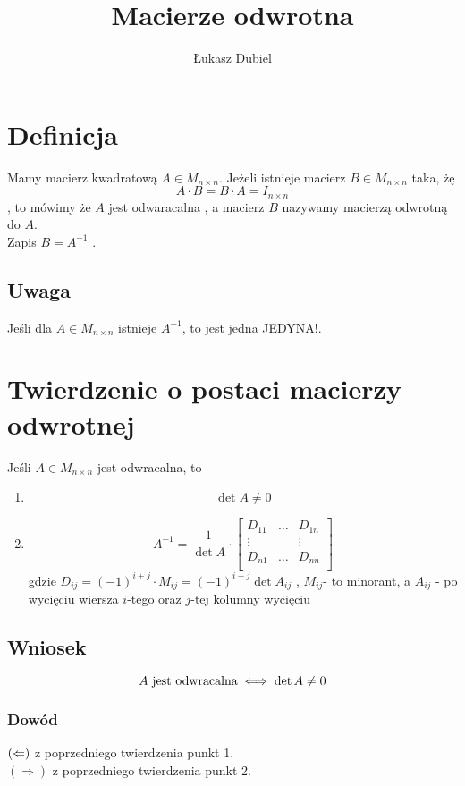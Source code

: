 \documentclass[11pt]{article}
\author{Łukasz Dubiel}
\title{Macierze odwrotna}
\begin{document}
\maketitle

\section{Definicja}
Mamy macierz kwadratową $A \in M_{n \times n}$. Jeżeli istnieje macierz $ B \in M_{ n \times n}$ taka, żę
$$ A \cdot B = B \cdot A = I_{n \times n} $$, to mówimy że  $A$ jest odwaracalna , a macierz $B$ nazywamy macierzą odwrotną do $A$. \\ Zapis $B = A^{-1}$ .

\subsection{Uwaga}
Jeśli dla $A \in M_{n \times n}$ istnieje $ A^{-1}$, to jest jedna JEDYNA!.

\section{Twierdzenie o postaci macierzy odwrotnej}
Jeśli $A \in M_{n \times n}$ jest odwracalna, to \\ \begin{enumerate}
\item{ $$\det{A}\not = 0$$}
\item{ $$A^{-1} = \frac{1}{\det{A}} \cdot \begin{bmatrix}
	D_{11} & \ldots & D_{1n}\\
	\vdots &  & \vdots\\
	D_{n1} & \ldots & D_{nn}\\
\end{bmatrix}$$ gdzie $D_{ij} = (-1)^{i+j} \cdot M_{ij} = (-1)^{i+j} \det{A_{ij}}$ , $M_{ij}$- to minorant, a $A_{ij}$ - po wycięciu wiersza $i$-tego oraz $j$-tej kolumny wycięciu}
\end{enumerate}
\subsection{Wniosek}
$$ A \hbox{ jest odwracalna} \iff \det{A} \not = 0 $$
\subsubsection{Dowód}
$\\(\Leftarrow)$ z poprzedniego twierdzenia punkt 1. \\
$(\Rightarrow)$ z poprzedniego twierdzenia punkt 2.
\end{document}
